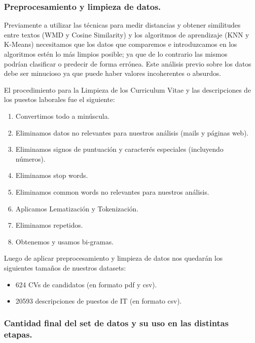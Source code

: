 \documentclass[12pt,a4paper]{article}
\begin{document}
\cleardoublepage

\subsubsection{Preprocesamiento y limpieza de datos.}
Previamente a utilizar las técnicas para medir distancias y obtener similitudes entre textos (WMD y Cosine Similarity) y los algoritmos de aprendizaje (KNN y K-Means) necesitamos que los datos que comparemos e introduzcamos en los algoritmos estén lo más limpios posible; ya que de lo contrario las mismos podrían clasificar o predecir de forma errónea. Este análisis previo sobre los datos debe ser minucioso ya que puede haber valores incoherentes o absurdos.

El procedimiento para la Limpieza de los Curriculum Vitae y las descripciones de los puestos laborales fue el siguiente:

\begin{enumerate}
\item Convertimos todo a minúscula.
\item Eliminamos datos no relevantes para nuestros análisis (mails y páginas web).
\item Eliminamos signos de puntuación y caracterés especiales (incluyendo números).
\item Eliminamos stop words.
\item Eliminamos common words no relevantes para nuestros análisis.
\item Aplicamos Lematización y Tokenización.
\item Eliminamos repetidos.
\item Obtenemos y usamos bi-gramas.
\end{enumerate}

Luego de aplicar preprocesamiento y limpieza de datos nos quedarán los siguientes tamaños de nuestros datasets:
\begin{itemize}
\item 624 CVs de candidatos (en formato pdf y csv).
\item 20593 descripciones de puestos de IT (en formato csv).
\end{itemize}

\cleardoublepage

\subsubsection{Cantidad final del set de datos y su uso en las distintas etapas.}
\end{document}
